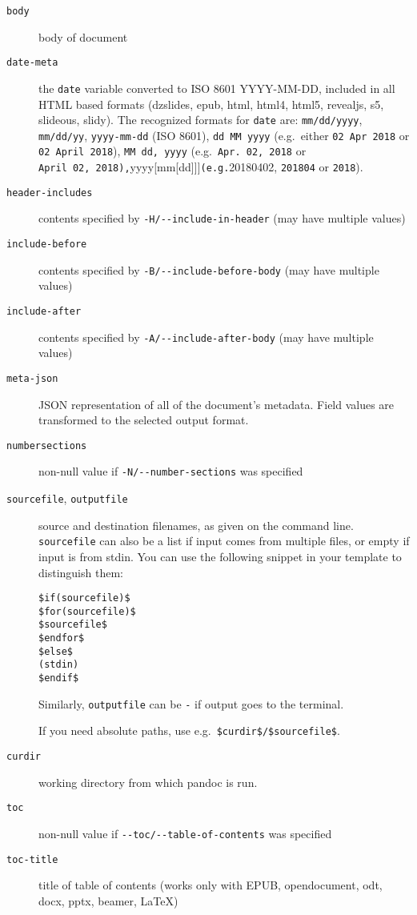 \begin{description}
\item[\texttt{body}]
body of document
\item[\texttt{date-meta}]
the \texttt{date} variable converted to ISO 8601 YYYY-MM-DD, included in
all HTML based formats (dzslides, epub, html, html4, html5, revealjs,
s5, slideous, slidy). The recognized formats for \texttt{date} are:
\texttt{mm/dd/yyyy}, \texttt{mm/dd/yy}, \texttt{yyyy-mm-dd} (ISO 8601),
\texttt{dd\ MM\ yyyy} (e.g.~either \texttt{02\ Apr\ 2018} or
\texttt{02\ April\ 2018}), \texttt{MM\ dd,\ yyyy}
(e.g.~\texttt{Apr.\ 02,\ 2018} or
\texttt{April\ 02,\ 2018),}yyyy{[}mm{[}dd{]}{]}{]}\texttt{(e.g.}20180402,
\texttt{201804} or \texttt{2018}).
\item[\texttt{header-includes}]
contents specified by \texttt{-H/-\/-include-in-header} (may have
multiple values)
\item[\texttt{include-before}]
contents specified by \texttt{-B/-\/-include-before-body} (may have
multiple values)
\item[\texttt{include-after}]
contents specified by \texttt{-A/-\/-include-after-body} (may have
multiple values)
\item[\texttt{meta-json}]
JSON representation of all of the document's metadata. Field values are
transformed to the selected output format.
\item[\texttt{numbersections}]
non-null value if \texttt{-N/-\/-number-sections} was specified
\item[\texttt{sourcefile}, \texttt{outputfile}]
source and destination filenames, as given on the command line.
\texttt{sourcefile} can also be a list if input comes from multiple
files, or empty if input is from stdin. You can use the following
snippet in your template to distinguish them:

\begin{verbatim}
$if(sourcefile)$
$for(sourcefile)$
$sourcefile$
$endfor$
$else$
(stdin)
$endif$
\end{verbatim}

Similarly, \texttt{outputfile} can be \texttt{-} if output goes to the
terminal.

If you need absolute paths, use e.g.~\texttt{\$curdir\$/\$sourcefile\$}.
\item[\texttt{curdir}]
working directory from which pandoc is run.
\item[\texttt{toc}]
non-null value if \texttt{-\/-toc/-\/-table-of-contents} was specified
\item[\texttt{toc-title}]
title of table of contents (works only with EPUB, opendocument, odt,
docx, pptx, beamer, LaTeX)
\end{description}

